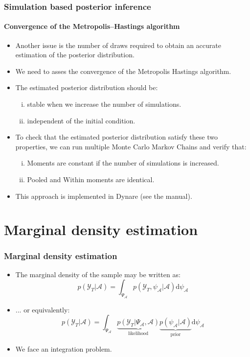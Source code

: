 \documentclass[10pt,slidestop]{beamer}
\newcommand{\sample}{\mathcal Y_T}
\begin{document}
\begin{frame}
  \frametitle{Simulation based posterior inference}
  \framesubtitle{Convergence of the Metropolis--Hastings algorithm}
  \begin{itemize}
  \item Another issue is the number of draws required to obtain
    an accurate estimation of the posterior distribution.
  \item We need to asses the convergence of the Metropolis
    Hastings algorithm.
  \item The estimated posterior distribution should be:
    {\footnotesize
      \begin{enumerate}[(i)]
      \item stable when we increase the number of simulations.
      \item independent of the initial condition.
      \end{enumerate}}
  \item To check that the estimated posterior distribution
    satisfy these two properties, we can run multiple
    Monte Carlo Markov Chains  and verify that:
    {\footnotesize
      \begin{enumerate}[(i)]
      \item Moments are constant if the number of simulations is increased.
      \item Pooled and Within moments are identical.
      \end{enumerate}}
  \item This approach is implemented in Dynare (see the manual).
  \end{itemize}
\end{frame}


\section{Marginal density estimation}

\begin{frame}
  \frametitle{Marginal density estimation}
  \begin{itemize}
  \item The marginal density of the sample may be written as:
    \[
    p(\sample|\mathcal{A}) = \int_{\Psi_{\mathcal{A}}}
    p(\sample,\psi_{\mathcal{A}}|\mathcal{A})\mathrm d\psi_{\mathcal{A}}
    \]
    \bigskip
  \item ... or equivalently:
    \[
    p(\sample|\mathcal{A}) = \int_{\Psi_{\mathcal{A}}}
    \underbrace{p(\sample|\Psi_{\mathcal{A}},\mathcal{A})}_{\text{likelihood}}
    \underbrace{p(\psi_{\mathcal{A}}|\mathcal{A})}_{\text{prior}}\mathrm d\psi_{\mathcal{A}}
    \]
    \bigskip
  \item We face an integration problem.
  \end{itemize}

\end{frame}
\end{document}
